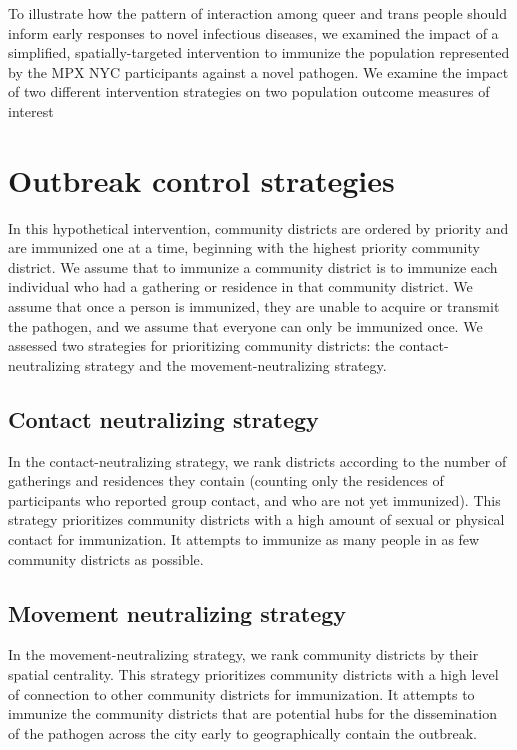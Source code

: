 \documentclass[
  letterpaper,
  DIV=11,
  numbers=noendperiod,
  oneside]{scrreprt}
\begin{document}
To illustrate how the pattern of interaction among queer and trans
people should inform early responses to novel infectious diseases, we
examined the impact of a simplified, spatially-targeted intervention to
immunize the population represented by the MPX NYC participants against
a novel pathogen. We examine the impact of two different intervention
strategies on two population outcome measures of interest

\hypertarget{outbreak-control-strategies}{%
\section{Outbreak control
strategies}\label{outbreak-control-strategies}}

In this hypothetical intervention, community districts are ordered by
priority and are immunized one at a time, beginning with the highest
priority community district. We assume that to immunize a community
district is to immunize each individual who had a gathering or residence
in that community district. We assume that once a person is immunized,
they are unable to acquire or transmit the pathogen, and we assume that
everyone can only be immunized once. We assessed two strategies for
prioritizing community districts: the contact-neutralizing strategy and
the movement-neutralizing strategy.

\hypertarget{contact-neutralizing-strategy}{%
\subsection{Contact neutralizing
strategy}\label{contact-neutralizing-strategy}}

In the contact-neutralizing strategy, we rank districts according to the
number of gatherings and residences they contain (counting only the
residences of participants who reported group contact, and who are not
yet immunized). This strategy prioritizes community districts with a
high amount of sexual or physical contact for immunization. It attempts
to immunize as many people in as few community districts as possible.

\hypertarget{movement-neutralizing-strategy}{%
\subsection{Movement neutralizing
strategy}\label{movement-neutralizing-strategy}}

In the movement-neutralizing strategy, we rank community districts by
their spatial centrality. This strategy prioritizes community districts
with a high level of connection to other community districts for
immunization. It attempts to immunize the community districts that are
potential hubs for the dissemination of the pathogen across the city
early to geographically contain the outbreak.
\end{document}
